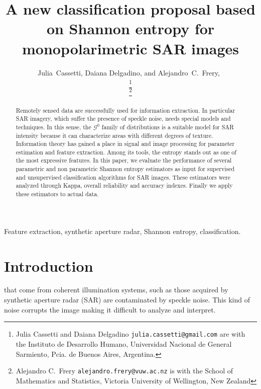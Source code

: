 \documentclass[journal]{IEEEtran}
\begin{document}
\title{A new classification proposal based on Shannon entropy for monopolarimetric SAR images}
\author{ Julia~Cassetti, Daiana Delgadino, and Alejandro~C.~Frery,~


\thanks{Julia Cassetti and Daiana Delgadino \texttt{julia.cassetti@gmail.com} are with the  Instituto de Desarrollo Humano, Universidad Nacional de General Sarmiento, Pcia. de Buenos Aires, Argentina.}

\thanks{Alejandro C.\ Frery \texttt{alejandro.frery@vuw.ac.nz} is with the School of Mathematics and Statistics, Victoria University of Wellington, New Zealand} 
}

\maketitle

\begin{abstract}
	
Remotely sensed data are successfully used for information extraction. 
In particular SAR imagery, which suffer the presence of speckle noise, needs special models and techniques. 
In this sense, the $\mathcal G^0$ family of distributions is a suitable model for SAR intensity because it can characterize areas with different degrees of texture. 
Information theory has gained a place in signal and image processing for parameter estimation and feature extraction.
Among its tools, the entropy stands out as one of the most expressive features.
In this paper, we evaluate the performance of several parametric and non parametric Shannon entropy estimators as input for supervised and unsupervised classification algorithms for SAR images.
These estimators were analyzed through Kappa, overall reliability and accuracy indexes. 
Finally we apply these estimators to actual data.

\end{abstract}

\begin{keywords}
Feature extraction, synthetic aperture radar, Shannon entropy, classification.
\end{keywords}

\IEEEpeerreviewmaketitle

\section{Introduction}
\label{intro}
 that come from coherent illumination systems, such as those acquired by synthetic aperture radar (SAR) are contaminated by speckle noise. 
This kind of noise corrupts the image making it difficult to analyze and interpret. 
\end{document}
